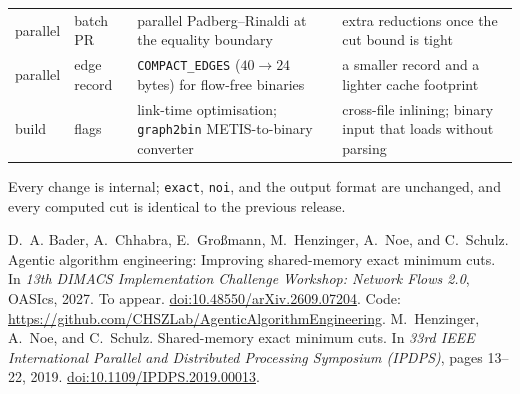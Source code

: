 \documentclass[10pt]{article}
\newcommand{\cfg}[1]{\texttt{#1}}
\begin{document}
\begin{center}
\begin{tabular}{@{}ll R{6.3cm} R{5.5cm}@{}}
parallel & batch PR     & parallel Padberg--Rinaldi at the equality boundary & extra reductions once the cut bound is tight\\
parallel & edge record  & \cfg{COMPACT\_EDGES} ($40\!\to\!24$ bytes) for flow-free binaries & a smaller record and a lighter cache footprint\\
build    & flags        & link-time optimisation; \cfg{graph2bin} METIS-to-binary converter & cross-file inlining; binary input that loads without parsing\\
\bottomrule
\end{tabular}
\end{center}

\smallskip
Every change is internal; \cfg{exact}, \cfg{noi}, and the output format are
unchanged, and every computed cut is identical to the previous release.

\begin{thebibliography}{9}
\small
\setlength{\itemsep}{1pt}
 D.~A. Bader, A.~Chhabra, E.~Gro{\ss}mann, M.~Henzinger, A.~Noe, and C.~Schulz.
  Agentic algorithm engineering: Improving shared-memory exact minimum cuts.
  In \emph{13th DIMACS Implementation Challenge Workshop: Network Flows 2.0}, OASIcs, 2027. To appear.
  \href{https://doi.org/10.48550/arXiv.2609.07204}{doi:10.48550/arXiv.2609.07204}.
  Code: \url{https://github.com/CHSZLab/AgenticAlgorithmEngineering}.
 M.~Henzinger, A.~Noe, and C.~Schulz.
  Shared-memory exact minimum cuts.
  In \emph{33rd IEEE International Parallel and Distributed Processing Symposium (IPDPS)}, pages 13--22, 2019.
  \href{https://doi.org/10.1109/IPDPS.2019.00013}{doi:10.1109/IPDPS.2019.00013}.
\end{thebibliography}
\end{document}

